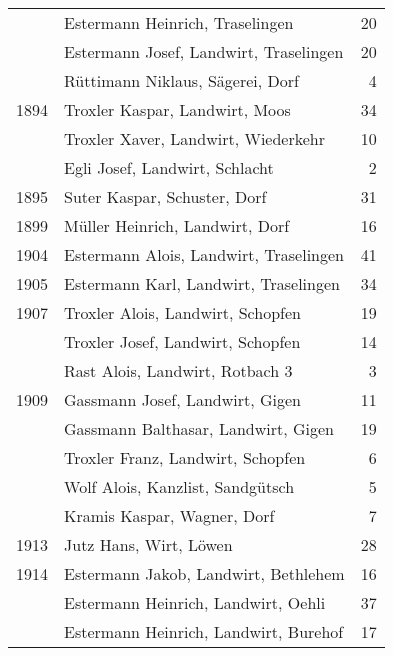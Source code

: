 {\begin{longtable}{ l l r }
                      & Estermann Heinrich, Traselingen           & 20          \\
                      & Estermann Josef, Landwirt, Traselingen    & 20          \\
                      & Rüttimann Niklaus, Sägerei, Dorf          & 4           \\
        1894          & Troxler Kaspar, Landwirt, Moos            & 34          \\
                      & Troxler Xaver, Landwirt, Wiederkehr       & 10          \\
                      & Egli Josef, Landwirt, Schlacht            & 2           \\
        1895          & Suter Kaspar, Schuster, Dorf              & 31          \\
        1899          & Müller Heinrich, Landwirt, Dorf           & 16          \\
        1904          & Estermann Alois, Landwirt, Traselingen    & 41          \\
        1905          & Estermann Karl, Landwirt, Traselingen     & 34          \\
        1907          & Troxler Alois, Landwirt, Schopfen         & 19          \\
                      & Troxler Josef, Landwirt, Schopfen         & 14          \\
                      & Rast Alois, Landwirt, Rotbach 3           & 3           \\
        1909          & Gassmann Josef, Landwirt, Gigen           & 11          \\
                      & Gassmann Balthasar, Landwirt, Gigen       & 19          \\
                      & Troxler Franz, Landwirt, Schopfen         & 6           \\
                      & Wolf Alois, Kanzlist, Sandgütsch          & 5           \\
                      & Kramis Kaspar, Wagner, Dorf               & 7           \\
        1913          & Jutz Hans, Wirt, Löwen                    & 28          \\
        1914          & Estermann Jakob, Landwirt, Bethlehem      & 16          \\
                      & Estermann Heinrich, Landwirt, Oehli       & 37          \\
                      & Estermann Heinrich, Landwirt, Burehof     & 17          \\

\end{longtable}}
